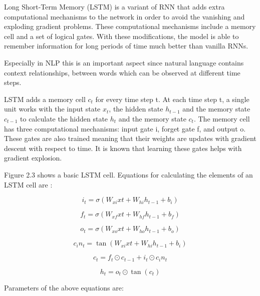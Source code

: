 Long Short-Term Memory (LSTM) is a variant of RNN that adds extra computational mechanisms to the network in order to avoid the vanishing and exploding gradient problems. These computational mechanisms include a memory cell and a set of logical gates. With these modifications, the model is able to remember information for long periods of time much better than vanilla RNNs.

Especially in NLP this is an important aspect since natural language contains context relationships, between words which can be observed at different time steps. 

LSTM adds a memory cell $c_{t}$ for every time step t. At each time step t, a single unit works with the input state $x_{t}$, the hidden state $h_{t-1}$ and the memory state $c_{t-1}$ to calculate the hidden state $h_{t}$ and the memory state $c_{t}$. The memory cell has three computational mechanisms: input gate i, forget gate f, and output o. These gates are also trained meaning that their weights are updates with gradient descent with respect to time. It is known that learning these gates helps with gradient explosion.

Figure 2.3 shows a basic LSTM cell. Equations for calculating the elements of an LSTM cell are \cite{paszke}:

\begin{equation}
i_{t} = \sigma(W_{xi}xt + W_{hi}h_{t-1} + b_{i})
\end{equation}

\begin{equation}
f_{t} = \sigma(W_{xf}xt + W_{hf}h_{t-1} + b_{f})
\end{equation}

\begin{equation}
o_{t} = \sigma(W_{xo}xt + W_{ho}h_{t-1} + b_{o})
\end{equation}

\begin{equation}
c_in_{t} = \tan(W_{xi}xt + W_{hi}h_{t-1} + b_{i})
\end{equation}

\begin{equation}
c_{t} = f_{t} \odot c_{t-1} + i_{t} \odot c_in_{t}
\end{equation}

\begin{equation}
h_{t} = o_{t} \odot \tan(c_{t}) 
\end{equation}

Parameters of the above equations are:

